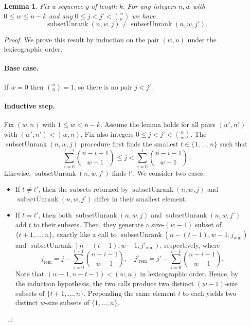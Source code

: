 \documentclass[11pt]{article}
\newcommand{\rem}{\mathrm{rem}}
\newcommand{\subunrank}{\operatorname{subsetUnrank}}
\newtheorem{lemma}{Lemma}
\begin{document}
\begin{lemma}\label{lem:inj-subunrank}
Fix a sequence $y$ of length $k$. For any integers $n,w$ with $0\leq w\leq n-k$ and any
$0 \leq j < j' < \binom{n}{w}$ we have
\begin{equation*}
    \subunrank(n,w,j) \neq \subunrank(n,w,j').
\end{equation*}
\end{lemma}
\begin{proof}
We prove this result by induction on the pair $(w,n)$ under the lexicographic order.

\paragraph{Base case.}
   If $w=0$ then $\binom{n}{0}=1$, so there is no pair $j<j'$.


\paragraph{Inductive step.}  
Fix $(w,n)$ with $1 \le w < n-k$.  Assume the lemma holds for all pairs $(w',n')$ with
$(w',n') < (w,n)$.
Fix also integers $0 \le j < j' < \binom{n}{w}$.  
The $\subunrank(n,w,j)$ procedure first finds the smallest
$t\in\{1,\dots,n\}$ such that
\begin{equation*}
    \sum_{i=0}^{t-1} \binom{n- i -1}{w-1} \leq j < \sum_{i=0}^{t} \binom{n- i -1}{w-1}.
\end{equation*}
Likewise, $\subunrank(n,w,j')$ finds $t'$.
We consider two cases:
\begin{itemize}
    \item If $t\neq t'$, then the subsets returned by $\subunrank(n,w,j)$ and $\subunrank(n,w,j')$ differ in their smallest element.

    \item If $t=t'$, then both $\subunrank(n,w,j)$ and $\subunrank(n,w,j')$ add $t$ to their subsets. 
    Then, they generate a size-$(w-1)$ subset of $\{t+1,\dots,n\}$, exactly like a call to $\subunrank(n-(t-1),w-1,j_{\rem})$ and $\subunrank(n-(t-1),w-1,j'_{\rem})$, respectively,
    where
    \begin{equation*}
        j_{\rem} = j - \sum_{i=0}^{t-1}\binom{n-i-1}{w-1},
    \quad
    j'_{\rem} = j' - \sum_{i=0}^{t-1}\binom{n-i-1}{w-1}.
    \end{equation*}
    Note that $(w-1,n-t-1)<(w,n)$ in lexicographic order.
Hence, by the induction hypothesis, the two calls
produce two distinct $(w-1)$-size subsets of $\{t+1,\dots,n\}$.  
Prepending the same
element $t$ to each yields two distinct $w$-size subsets of $\{1,\dots,n\}$. \qedhere
\end{itemize}
\end{proof}
\end{document}

